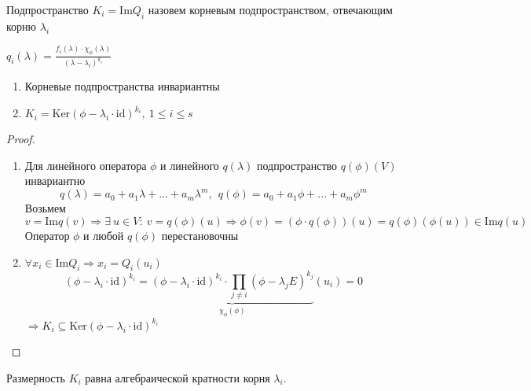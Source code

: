     \begin{definition}
        Подпространство $K_i = \text{Im} Q_i$ назовем корневым подпространством, отвечающим корню $\lambda_i$
    \end{definition}
    $q_i(\lambda) = \frac{f_i(\lambda)\cdot \chi_\phi(\lambda)}{(\lambda-\lambda_i)^{k_i}}$ 
    \begin{subtheorem}\tab
        \begin{enumerate}
            \item Корневые подпространства инвариантны
            \item $K_i = \text{Ker} (\phi - \lambda_i\cdot \text{id})^{k_i}, \ 1\leq i \leq s$ 
        \end{enumerate}
    \end{subtheorem}
    \begin{proof}\tab 
        \begin{enumerate}
            \item Для линейного оператора $\phi$ и линейного $q(\lambda)$ подпространство $q(\phi)(V)$ инвариантно
            $$q(\lambda) = a_0+ a_1 \lambda + ... + a_m \lambda^m, \ \ q(\phi) = a_0+ a_1 \phi + ... + a_m \phi^m$$
            Возьмем $v = \text{Im}q(v) \Longrightarrow \exists \ u \in V: \ v = q(\phi)(u) \Longrightarrow \phi(v) = (\phi \cdot q(\phi))(u) = q(\phi)(\phi(u)) \in \text{Im}q(u)$
            Оператор $\phi$ и любой $q(\phi)$ перестановочны
            \item $\forall x_i \in \text{Im}Q_i \Longrightarrow x_i = Q_i(u_i)$
            $$(\phi-\lambda_i \cdot \text{id})^{k_i} = \underbrace{(\phi-\lambda_i \cdot \text{id})^{k_i} \cdot \prod\limits_{j \neq i}(\phi-\lambda_j E)^{k_j}}_{\chi_\phi(\phi)}(u_i) = 0$$
            $\Longrightarrow K_i \subseteq \text{Ker}(\phi-\lambda_i \cdot \text{id})^{k_i}$     
        \end{enumerate}
    \end{proof} 
    \begin{theorem}
        Размерность $K_i$ равна алгебраической кратности корня $\lambda_i$.
    \end{theorem}
